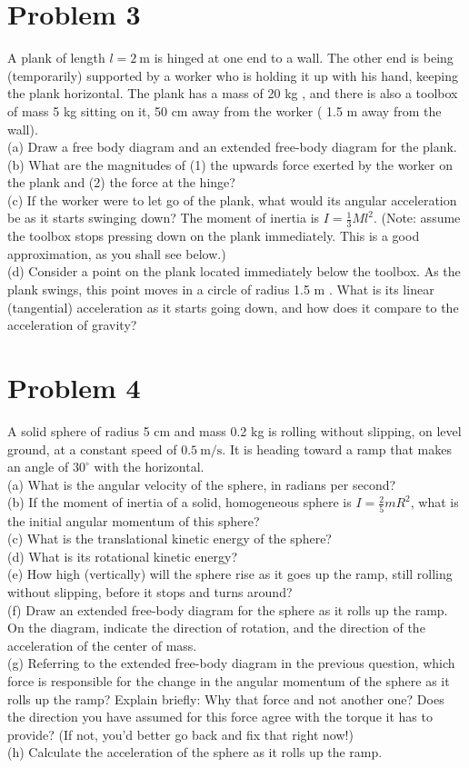 \documentclass[10pt]{article}
\begin{document}
\section*{Problem 3}
A plank of length $l=2 \mathrm{~m}$ is hinged at one end to a wall. The other end is being (temporarily) supported by a worker who is holding it up with his hand, keeping the plank horizontal. The plank has a mass of 20 kg , and there is also a toolbox of mass 5 kg sitting on it, 50 cm away from the worker ( 1.5 m away from the wall).\\
(a) Draw a free body diagram and an extended free-body diagram for the plank.\\
(b) What are the magnitudes of (1) the upwards force exerted by the worker on the plank and (2) the force at the hinge?\\
(c) If the worker were to let go of the plank, what would its angular acceleration be as it starts swinging down? The moment of inertia is $I=\frac{1}{3} M l^{2}$. (Note: assume the toolbox stops pressing down on the plank immediately. This is a good approximation, as you shall see below.)\\
(d) Consider a point on the plank located immediately below the toolbox. As the plank swings, this point moves in a circle of radius 1.5 m . What is its linear (tangential) acceleration as it starts going down, and how does it compare to the acceleration of gravity?

\section*{Problem 4}
A solid sphere of radius 5 cm and mass 0.2 kg is rolling without slipping, on level ground, at a constant speed of $0.5 \mathrm{~m} / \mathrm{s}$. It is heading toward a ramp that makes an angle of $30^{\circ}$ with the horizontal.\\
(a) What is the angular velocity of the sphere, in radians per second?\\
(b) If the moment of inertia of a solid, homogeneous sphere is $I=\frac{2}{5} m R^{2}$, what is the initial angular momentum of this sphere?\\
(c) What is the translational kinetic energy of the sphere?\\
(d) What is its rotational kinetic energy?\\
(e) How high (vertically) will the sphere rise as it goes up the ramp, still rolling without slipping, before it stops and turns around?\\
(f) Draw an extended free-body diagram for the sphere as it rolls up the ramp. On the diagram, indicate the direction of rotation, and the direction of the acceleration of the center of mass.\\
(g) Referring to the extended free-body diagram in the previous question, which force is responsible for the change in the angular momentum of the sphere as it rolls up the ramp? Explain briefly: Why that force and not another one? Does the direction you have assumed for this force agree with the torque it has to provide? (If not, you'd better go back and fix that right now!)\\
(h) Calculate the acceleration of the sphere as it rolls up the ramp.
\end{document}
